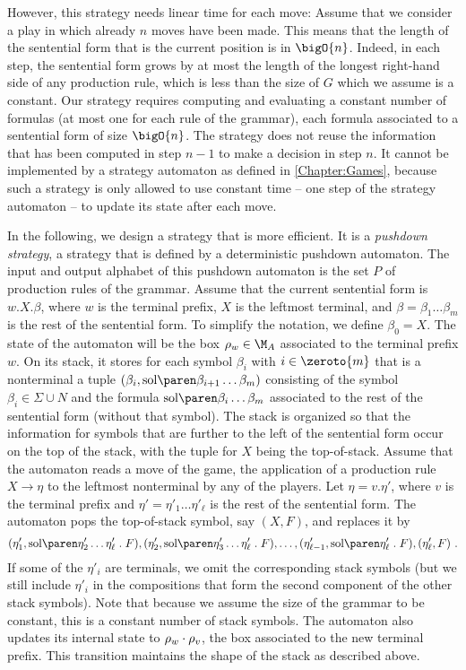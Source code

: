 \documentclass[../../diss.tex]{subfiles}
\begin{document}
However, this strategy needs linear time for each move:
Assume that we consider a play in which already $n$ moves have been made.
This means that the length of the sentential form that is the current position is in $\bigO{n}$.
Indeed, in each step, the sentential form grows by at most the length of the longest right-hand side of any production rule, which is less than the size of $G$ which we assume is a constant.
Our strategy requires computing and evaluating a constant number of formulas (at most one for each rule of the grammar), each formula associated to a sentential form of size $\bigO{n}$.
The strategy does not reuse the information that has been computed in step $n-1$ to make a decision in step $n$.
It cannot be implemented by a strategy automaton as defined in \cref{Chapter:Games}, because such a strategy is only allowed to use constant time -- one step of the strategy automaton -- to update its state after each move.

In the following, we design a strategy that is more efficient.
It is a \emph{pushdown strategy}, a strategy that is defined by a deterministic pushdown automaton.
The input and output alphabet of this pushdown automaton is the set $P$ of production rules of the grammar.
Assume that the current sentential form is $w.X.\beta$, where $w$ is the terminal prefix, $X$ is the leftmost terminal, and $\beta = \beta_1 \ldots \beta_m$ is the rest of the sentential form.
To simplify the notation, we define $\beta_0 = X $.
The state of the automaton will be the box $\tbox{w} \in \nfatransmonoid{A}$ associated to the terminal prefix $w$.
On its stack, it stores for each symbol $\beta_i$ with $i \in \zeroto{m}$ that is a nonterminal a tuple $(\beta_i, \sol{\beta_{i+1} \ldots \beta_m})$ consisting of the symbol $\beta_i \in \Sigma \cup N$ and the formula $\sol{\beta_i \ldots \beta_m}$ associated to the rest of the sentential form (without that symbol).
The stack is organized so that the information for symbols that are further to the left of the sentential form occur on the top of the stack, with the tuple for $X$ being the top-of-stack.
%
Assume that the automaton reads a move of the game, \ie the application of a production rule $X \to \eta$ to the leftmost nonterminal by any of the players.
Let $\eta = v.\eta'$, where $v$ is the terminal prefix and $\eta' = \eta'_1 \ldots \eta'_\ell$ is the rest of the sentential form.
The automaton pops the top-of-stack symbol, say $(X, F)$, and replaces it by
\[
    (\eta'_1, \sol{\eta'_2 \ldots \eta'_\ell} \comp F),
    (\eta'_2, \sol{\eta'_3 \ldots \eta'_\ell} \comp F),
    \ldots,
    (\eta'_{\ell - 1}, \sol{ \eta'_\ell} \comp F),
    (\eta'_\ell, F)
    \ .
\]
If some of the $\eta'_i$ are terminals, we omit the corresponding stack symbols (but we still include $\eta'_i$ in the compositions that form the second component of the other stack symbols).
Note that because we assume the size of the grammar to be constant, this is a constant number of stack symbols.
The automaton also updates its internal state to $\tbox{w} \relcomp \tbox{v}$, \ie the box associated to the new terminal prefix.
This transition maintains the shape of the stack as described above.
\end{document}
